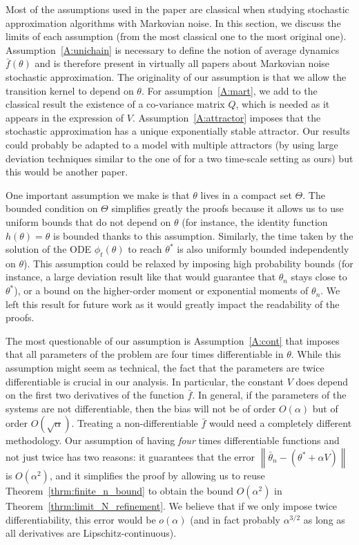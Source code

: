 \documentclass{article}
\newcommand\norm[1]{\left\|#1\right\|}
\begin{document}
Most of the assumptions used in the paper are classical when studying stochastic approximation algorithms with Markovian noise. In this section, we discuss the limits of each assumption (from the most classical one to the most original one). Assumption~\ref{A:unichain} is necessary to define the notion of average dynamics $\bar{f}(\theta)$ and is therefore present in virtually all papers about Markovian noise stochastic approximation. The originality of our assumption is that we allow the transition kernel to depend on $\theta$. For assumption~\ref{A:mart}, we add to the classical result the existence of a co-variance matrix $Q$, which is needed as it appears in the expression of $V$.  Assumption~\ref{A:attractor} imposes that the stochastic approximation has a unique exponentially stable attractor. Our results could probably be adapted to a model with multiple attractors (by using large deviation techniques similar to the one of \cite{azizian2024long,yasodharan2022large} for a two time-scale setting as ours) but this would be another paper. 

One important assumption we make is that $\theta$ lives in a compact set $\Theta$. The bounded condition on $\Theta$ simplifies greatly the proofs because it allows us to use uniform bounds that do not depend on $\theta$ (for instance, the identity function $h(\theta)=\theta$ is bounded thanks to this assumption. Similarly, the time taken by the solution of the ODE $\phi_t(\theta)$ to reach $\theta^*$ is also uniformly bounded independently on $\theta$). This assumption could be relaxed by imposing high probability bounds (for instance, a large deviation result like \cite{azizian2024long} that would guarantee that $\theta_n$ stays close to $\theta^*$), or a bound on the higher-order moment or exponential moments of $\theta_n$. We left this result for future work as it would greatly impact the readability of the proofs. 

The most questionable of our assumption is Assumption~\ref{A:cont} that imposes that all parameters of the problem are four times differentiable in $\theta$.  While this assumption might seem as technical, the fact that the parameters are twice differentiable is crucial in our analysis. In particular, the constant $V$ does depend on the first two derivatives of the function $\bar{f}$. In general, if the parameters of the systems are not differentiable, then the bias will not be of order $O(\alpha)$ but of order $O(\sqrt{\alpha})$. Treating a non-differentiable $\bar{f}$ would need a completely different methodology.  Our assumption of having \emph{four} times differentiable functions and not just twice has two reasons: it guarantees that the error $\norm{\bar{\theta}_n-(\theta^*+\alpha V)}$ is $O(\alpha^2)$, and it simplifies the proof by allowing us to reuse Theorem~\ref{thrm:finite_n_bound} to obtain the bound $O(\alpha^2)$ in Theorem~\ref{thrm:limit_N_refinement}. We believe that if we only impose twice differentiability, this error would be $o(\alpha)$ (and in fact probably $\alpha^{3/2}$ as long as all derivatives are Lipschitz-continuous).
\end{document}
